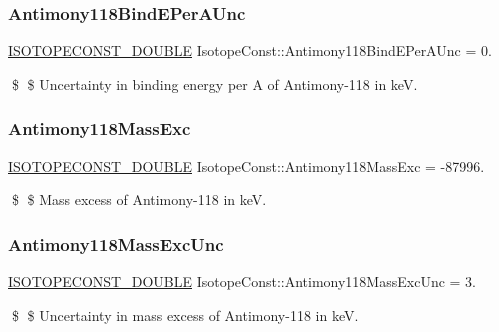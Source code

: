 \subsubsection{\texorpdfstring{Antimony118\+Bind\+E\+Per\+A\+Unc}{Antimony118BindEPerAUnc}}
{\footnotesize\ttfamily \mbox{\hyperlink{group___isotope_const-_macros_ga8f45a7272ce02c0b4c65c44636ed719a}{I\+S\+O\+T\+O\+P\+E\+C\+O\+N\+S\+T\+\_\+\+D\+O\+U\+B\+LE}} Isotope\+Const\+::\+Antimony118\+Bind\+E\+Per\+A\+Unc = 0.}

\$ \$ Uncertainty in binding energy per A of Antimony-\/118 in keV. \mbox{\label{group___isotope_const-_antimony-_sb118_gad832e4fb2180740f5e4dee671639a58f}} 
\subsubsection{\texorpdfstring{Antimony118\+Mass\+Exc}{Antimony118MassExc}}
{\footnotesize\ttfamily \mbox{\hyperlink{group___isotope_const-_macros_ga8f45a7272ce02c0b4c65c44636ed719a}{I\+S\+O\+T\+O\+P\+E\+C\+O\+N\+S\+T\+\_\+\+D\+O\+U\+B\+LE}} Isotope\+Const\+::\+Antimony118\+Mass\+Exc = -\/87996.}

\$ \$ Mass excess of Antimony-\/118 in keV. \mbox{\label{group___isotope_const-_antimony-_sb118_ga601e3974eaffab713f4c8ef38307bdd0}} 
\subsubsection{\texorpdfstring{Antimony118\+Mass\+Exc\+Unc}{Antimony118MassExcUnc}}
{\footnotesize\ttfamily \mbox{\hyperlink{group___isotope_const-_macros_ga8f45a7272ce02c0b4c65c44636ed719a}{I\+S\+O\+T\+O\+P\+E\+C\+O\+N\+S\+T\+\_\+\+D\+O\+U\+B\+LE}} Isotope\+Const\+::\+Antimony118\+Mass\+Exc\+Unc = 3.}

\$ \$ Uncertainty in mass excess of Antimony-\/118 in keV. \mbox{\label{group___isotope_const-_antimony-_sb118_ga57824cd81ce18bb7cb056f678b6c39a5}} 
